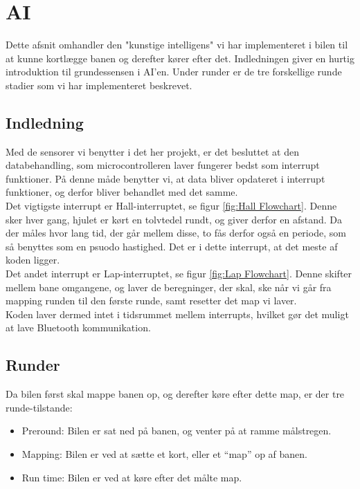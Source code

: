 \section{AI}
Dette afsnit omhandler den "kunstige intelligens" vi har implementeret i bilen til at kunne kortlægge banen og derefter kører efter det. Indledningen giver en hurtig introduktion til grundessensen i AI'en. Under runder er de tre forskellige runde stadier som vi har implementeret beskrevet.


\subsection{Indledning}
Med de sensorer vi benytter i det her projekt, er det besluttet at den databehandling, som microcontrolleren laver fungerer bedst som interrupt funktioner. På denne måde benytter vi, at data bliver opdateret i interrupt funktioner, og derfor bliver behandlet med det samme.
\\

Det vigtigste interrupt er Hall-interruptet, se figur \ref{fig:Hall Flowchart}. Denne sker hver gang, hjulet er kørt en tolvtedel rundt, og giver derfor en afstand. Da der måles hvor lang tid, der går mellem disse, to fås derfor også en periode, som så benyttes som en psuodo hastighed. Det er i dette interrupt, at det meste af koden ligger.
\\

Det andet interrupt er Lap-interruptet, se figur \ref{fig:Lap Flowchart}. Denne skifter mellem bane omgangene, og laver de beregninger, der skal, ske når vi går fra mapping runden til den første runde, samt resetter det map vi laver.
\\

Koden laver dermed intet  i tidsrummet mellem interrupts, hvilket gør det muligt at lave Bluetooth kommunikation.

\subsection{Runder}

Da bilen først skal mappe banen op, og derefter køre efter dette map, er der tre runde-tilstande:

\begin{itemize}
\item Preround: Bilen er sat ned på banen, og venter på at ramme målstregen.
\item Mapping: Bilen er ved at sætte et kort, eller et ``map'' op af banen.
\item Run time: Bilen er ved at køre efter det målte map.
\end{itemize}

